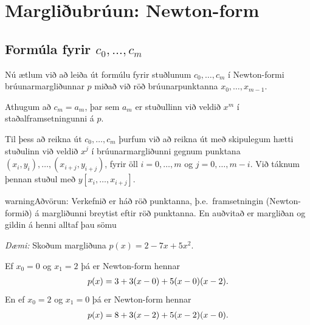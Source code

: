 \documentclass[A4paper,10pt,icelandic]{sphinxmanual}
\begin{document}

\section{Margliðubrúun: Newton-form}
\label{kafli03:index-8}\label{kafli03:margliubruun-newton-form}

\subsection{Formúla fyrir \(c_0, \ldots, c_m\)}
\label{kafli03:formula-fyrir}
Nú ætlum við að leiða út formúlu fyrir stuðlunum
\(c_0, \ldots, c_m\) í Newton-formi brúunarmargliðunnar \(p\)
miðað við röð brúunarpunktanna \(x_0, \ldots, x_{m-1}\).

Athugum að \(c_m = a_m\), þar sem \(a_m\) er stuðullinn við
veldið \(x^m\) í staðalframsetningunni á \(p\).

Til þess að reikna út \(c_0, \ldots, c_m\) þurfum við að reikna út
með skipulegum hætti stuðulinn við veldið \(x^j\) í
brúunarmargliðunni gegnum punktana
\((x_i,y_i), \ldots, (x_{i+j},y_{i+j})\), fyrir öll
\(i = 0, \ldots, m\) og \(j = 0, \ldots, m-i\). Við táknum
þennan stuðul með \(y[x_i, \ldots, x_{i+j}]\).

\begin{notice}{warning}{Aðvörun:}
Verkefnið er háð röð punktanna, þ.e. framsetningin (Newton-formið) á
margliðunni breytist eftir röð punktanna.
En auðvitað er margliðan og gildin á henni alltaf þau sömu

\emph{Dæmi:} Skoðum margliðuna \(p(x) = 2-7x+5x^2\).

Ef \(x_0=0\) og \(x_1=2\) þá er Newton-form hennar
\begin{gather}
\begin{split}p(x) = 3 + 3(x-0) + 5(x-0)(x-2).\end{split}\notag
\end{gather}
En ef \(x_0=2\) og \(x_1=0\) þá er Newton-form hennar
\begin{gather}
\begin{split}p(x) = 8 + 3(x-2) + 5(x-2)(x-0).\end{split}\notag
\end{gather}\end{notice}

\end{document}

